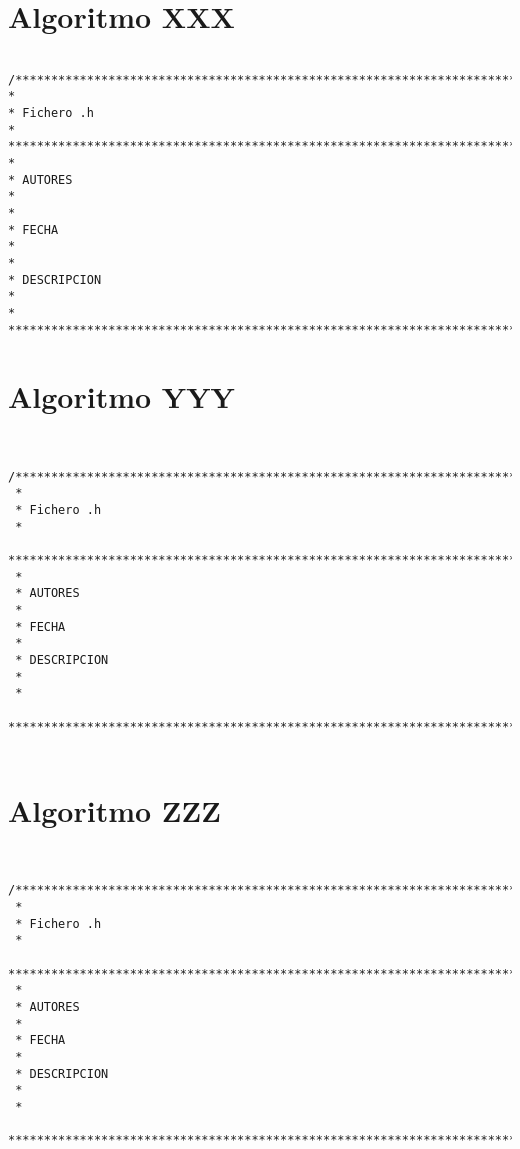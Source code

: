 \section{Algoritmo XXX}
\label{Apendice1:XXX}

\begin{center}
\begin{footnotesize}
\begin{verbatim}

/***********************************************************************************
*
* Fichero .h
*
***********************************************************************************
*
* AUTORES
*   
*
* FECHA
*   
*
* DESCRIPCION
*   
*
************************************************************************************/

\end{verbatim}
\end{footnotesize}
\end{center}

\section{Algoritmo YYY}
\label{Apendice1:YYY}

\begin{center}
\begin{footnotesize}
\begin{verbatim}


/***********************************************************************************
 *
 * Fichero .h
 *
 ***********************************************************************************
 *
 * AUTORES
 *
 * FECHA
 *
 * DESCRIPCION
 *
 *
 ************************************************************************************/
 
\end{verbatim}
\end{footnotesize}
\end{center}

\section{Algoritmo ZZZ}
\label{Apendice1:ZZZ}

\begin{center}
\begin{footnotesize}
\begin{verbatim}


/***********************************************************************************
 *
 * Fichero .h
 *
 ***********************************************************************************
 *
 * AUTORES
 *
 * FECHA
 *
 * DESCRIPCION
 *
 *
 ************************************************************************************/
 
\end{verbatim}
\end{footnotesize}
\end{center}

